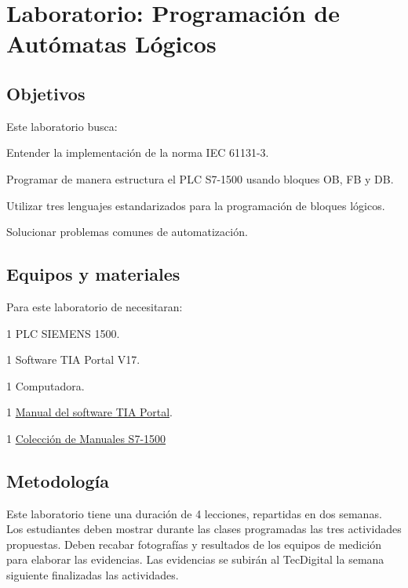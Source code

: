 \chapter{Laboratorio:  Programación de Autómatas Lógicos}


\section{Objetivos}
Este  laboratorio busca:
\begin{itemize}
	{\small
    \item Entender la implementación de la norma IEC 61131-3.
    \item Programar  de manera estructura el PLC S7-1500 usando bloques OB, FB y DB.
    \item Utilizar tres lenguajes estandarizados para la programación de bloques lógicos.
    \item Solucionar problemas comunes de automatización.
 }
\end{itemize} 

 
\section{Equipos y materiales}
Para este laboratorio de necesitaran:
\begin{itemize}
	{\small 
	\item 1 PLC SIEMENS 1500.
	\item 1 Software TIA Portal V17.
	\item 1 Computadora.
	\item 1 \href{https://support.industry.siemens.com/dl/files/056/109815056/att_1121729/v4/STEP_7_WinCC_V18_esES_es-ES.pdf}{Manual del software TIA Portal}.
	\item 1 \href{https://cache.industry.siemens.com/dl/files/384/86140384/att_1131259/v1/s71500_et200mp_manual_collection_es-ES.pdf}{Colección de Manuales S7-1500}
}
\end{itemize}

\section{Metodología}

Este laboratorio tiene una duración de 4 lecciones, repartidas en dos semanas. Los estudiantes deben mostrar durante las clases programadas las tres actividades propuestas. Deben recabar fotografías y resultados de los equipos de medición para elaborar las evidencias. Las evidencias se subirán al TecDigital la semana siguiente finalizadas las actividades.

